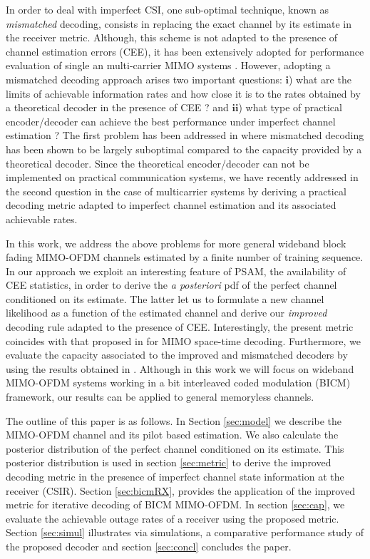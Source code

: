 \documentclass{article}
\begin{document}
In order to deal with imperfect CSI, one sub-optimal technique, known as {\it mismatched} decoding, consists in replacing the exact channel by its estimate in the receiver metric. Although, this scheme is not adapted to the presence of channel estimation errors (CEE), it has been extensively adopted for performance evaluation of single an multi-carrier MIMO systems \cite{garg05}.
However, adopting a mismatched decoding approach arises two important questions: $\textbf{i}$) what are the limits of achievable information rates and how close it is to the rates obtained by a theoretical decoder in the presence of CEE ? and $\textbf{ii}$) what type of practical encoder/decoder can achieve the best performance under imperfect channel estimation ?
The first problem has been addressed in \cite{piantanida} where mismatched decoding has been shown to be largely suboptimal compared to the capacity provided by a theoretical decoder. Since the theoretical encoder/decoder can not be implemented on practical communication systems, we have recently addressed in \cite{sadough06} the second question in the case of multicarrier systems by deriving a practical decoding metric adapted to imperfect channel estimation and its associated achievable rates.\vspace{-0.5mm}


In this work, we address the above problems for more general wideband block fading MIMO-OFDM channels estimated by a finite number of training sequence. In our approach we exploit an interesting feature of PSAM, the availability of CEE statistics, in order to derive the {\it a posteriori} pdf of the perfect channel conditioned on its estimate. The latter let us to formulate a new channel likelihood as a function of the estimated channel and derive our {\it improved} decoding rule adapted to the presence of CEE. Interestingly, the present metric coincides with that proposed in \cite{Biglieri_jour} for MIMO space-time decoding. Furthermore, we evaluate the capacity associated to the improved and mismatched decoders by using the results obtained in \cite{merhav94}. Although in this work we will focus on wideband MIMO-OFDM systems working in a bit interleaved coded modulation (BICM) framework, our results can be applied to general memoryless channels.\vspace{-0.5mm}

The outline of this paper is as follows. In Section \ref{sec:model} we describe the MIMO-OFDM channel and its pilot based estimation. We also calculate the posterior distribution of the perfect channel conditioned on its estimate. This posterior distribution is used in section \ref{sec:metric} to derive the improved decoding metric in the presence of imperfect channel state information at the receiver (CSIR). Section \ref{sec:bicmRX}, provides the application of the improved metric for iterative decoding of BICM MIMO-OFDM. In section \ref{sec:cap}, we evaluate the achievable outage rates of a receiver using the proposed metric.
Section \ref{sec:simul} illustrates via simulations, a comparative performance study of the proposed decoder and section \ref{sec:concl} concludes the paper.\vspace{-0.5mm}
\end{document}
